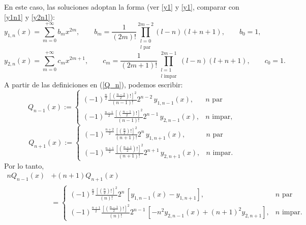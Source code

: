 En este caso, las soluciones adoptan la forma (ver \eqref{y1} y \eqref{y1}, comparar con \eqref{y1n1} y \eqref{y2n1}):
\begin{equation}\label{y1n}
y_{1,n}(x) = \sum_{m= 0}^{+\infty}b_mx^{2m}, \qquad b_m=\frac{1}{(2m)!}
\prod_{\substack{l=0 \\ l \text{ par}}}^{2m-2}
(l-n)(l+n+1), \qquad b_0=1,  
\end{equation}
\begin{equation}\label{y2n}
y_{2,n}(x)=\sum_{m= 0}^{+\infty}c_mx^{2m+1}, \qquad c_m=\frac{1}{(2m+1)!}
\prod_{\substack{l=1 \\ l \text{ impar}}}^{2m-1}
 (l-n)(l+n+1), \qquad c_0=1.
\end{equation}
A partir de las definiciones en (\ref{Q_n}), podemos escribir:
\begin{equation}
Q_{n-1}(x):=
	\begin{cases}
	(-1)^{\frac{n}{2}}\frac{[(\frac{n-2}{2})!]^2}{(n-1)!} 2^{n-2} \, y_{1,n-1}(x), & n \text{ par}\\
	(-1)^{\frac{n-1}{2}}\frac{\left[\left(\frac{n-1}{2}\right)!\right]^2}{(n-1)!}2^{n-1}\, y_{2,n-1}(x), & n \text{ impar},
	\end{cases} \label{Q_n-1}
\end{equation}
\begin{equation}
Q_{n+1}(x):=
	\begin{cases}
	(-1)^{\frac{n+2}{2}}\frac{[(\frac{n}{2})!]^2}{(n+1)!} 2^{n} \, y_{1,n+1}(x), & n \text{ par}\\
	(-1)^{\frac{n+1}{2}}\frac{\left[\left(\frac{n+1}{2}\right)!\right]^2}{(n+1)!}2^{n+1}\, y_{2,n+1}(x), & n \text{ impar}.
	\end{cases} \label{Q_n+1}
\end{equation}
Por lo tanto,
\begin{align}
nQ_{n-1}(x) &+ (n+1)Q_{n+1}(x) \nonumber \\
&=\begin{cases}
	(-1)^{\frac{n}{2}}\frac{[(\frac{n}{2})!]^2}{(n)!} 2^{n} \, \left[ y_{1,n-1}(x)-y_{1,n+1} \right], & n \text{ par}\\
	(-1)^{\frac{n+1}{2}}\frac{\left[\left(\frac{n-1}{2}\right)!\right]^2}{(n)!}2^{n-1}\,\left[ -n^2y_{2,n-1}(x)+(n+1)^2y_{2,n+1} \right] , & n \text{ impar}.
	\end{cases} \label{rel.QQ}
\end{align}

